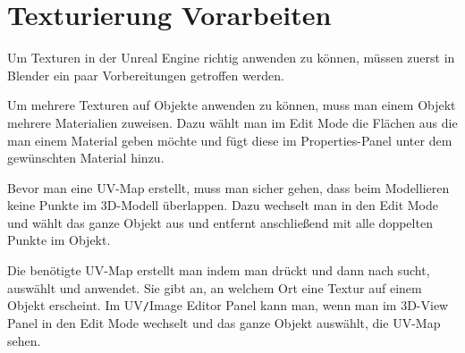 \section{Texturierung Vorarbeiten}
Um Texturen in der Unreal Engine richtig anwenden zu können, müssen zuerst in Blender ein paar Vorbereitungen getroffen werden.

Um mehrere Texturen auf Objekte anwenden zu können, muss man einem Objekt mehrere Materialien zuweisen. Dazu wählt man im Edit Mode die Flächen aus die man einem Material geben
möchte und fügt diese im Properties-Panel unter  dem gewünschten Material hinzu.

Bevor man eine UV-Map erstellt, muss man sicher gehen, dass beim Modellieren keine Punkte im 3D-Modell überlappen.
Dazu wechselt man in den Edit Mode und wählt das ganze Objekt aus und entfernt anschließend mit  
alle doppelten Punkte im Objekt.

Die benötigte UV-Map erstellt man indem man \keys{\SPACE} drückt und dann nach  sucht, auswählt und anwendet. Sie gibt an, an welchem Ort
eine Textur auf einem Objekt erscheint. Im UV\verb-/-Image Editor Panel kann man, wenn man im 3D-View Panel in den Edit Mode
wechselt und das ganze Objekt auswählt, die UV-Map sehen.
